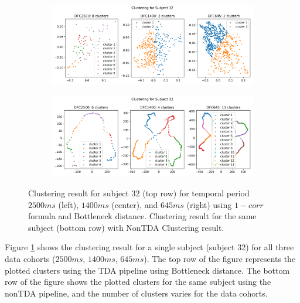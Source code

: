 \begin{figure}[!tbh]
	\centering
	\begin{subfigure}[t]{1\textwidth}
		\centering
		\hspace{8mm}
		\includegraphics[width=1\textwidth, trim={0cm, 0.0cm, 0.0cm, 0.0cm}]{figures/new_formula_tda_bn_subject_32.png}\hfill
	\end{subfigure}
	\begin{subfigure}[t]{1\textwidth}
		\centering
		\hspace{8mm}
		\includegraphics[width=1\textwidth, trim={0cm, 0.0cm, 0.0cm, 0.0cm}]{figures/new_formula_nontda_subject_32.png}\hfill
	\end{subfigure}
	\caption{Clustering result for subject $32$ (top row) for temporal period $2500ms$ (left), $1400ms$ (center), and $645ms$ (right) using $1 - corr$ formula and Bottleneck distance. Clustering result for the same subject (bottom row) with NonTDA Clustering result.}
	\label{fig:clus_new_formula}
\end{figure}

Figure \ref{fig:clus_new_formula} shows the clustering result for a single subject (subject 32) for all three data cohorts ($2500ms$, $1400ms$, $645ms$). The top row of the figure represents the plotted clusters using the TDA pipeline using Bottleneck distance. The bottom row of the figure shows the plotted clusters for the same subject using the nonTDA pipeline, and the number of clusters varies for the data cohorts. 

